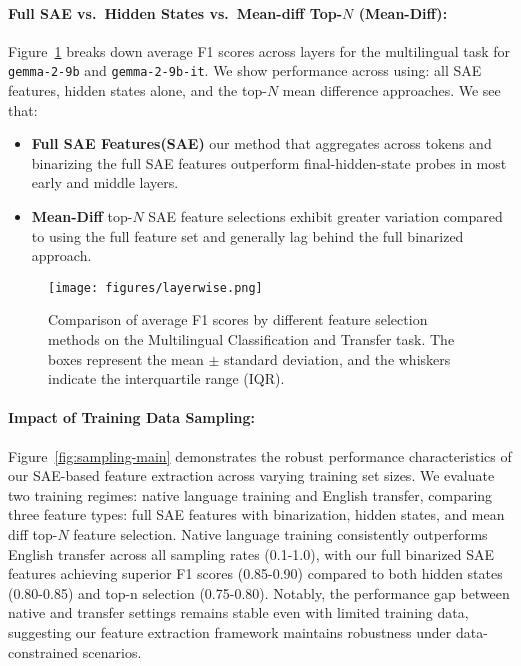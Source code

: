 \paragraph{Full SAE vs.\ Hidden States vs.\ Mean-diff Top-$N$ (Mean-Diff):}
Figure~\ref{fig:layerwise} breaks down average F1 scores across layers for the multilingual task for \texttt{gemma-2-9b} and \texttt{gemma-2-9b-it}. We show performance across using: all SAE features, hidden states alone, and the top-$N$ mean difference approaches.
We see that:
\begin{itemize}
    \item \textbf{Full SAE Features(SAE)} our method that aggregates across tokens and binarizing  the full SAE features outperform final-hidden-state probes in most early and middle layers. 
    \item \textbf{Mean-Diff} top-$N$ SAE feature selections exhibit greater variation compared to using the full feature set and generally lag behind the full binarized approach.
\end{itemize}

\begin{figure}[t]
    \centering
    \texttt{[image: figures/layerwise.png]}
    \caption{Comparison of average F1 scores by different feature selection methods on the Multilingual Classification and Transfer task. The boxes represent the mean $\pm$ standard deviation, and the whiskers indicate the interquartile range (IQR).}
    \label{fig:layerwise}
\end{figure}



\paragraph{Impact of Training Data Sampling:} Figure~\ref{fig:sampling-main} demonstrates the robust performance characteristics of our SAE-based feature extraction across varying training set sizes. We evaluate two training regimes: native language training and English transfer, comparing three feature types: full SAE features with binarization, hidden states, and mean diff top-$N$ feature selection. Native language training consistently outperforms English transfer across all sampling rates (0.1-1.0), with our full binarized SAE features achieving superior F1 scores (0.85-0.90) compared to both hidden states (0.80-0.85) and top-n selection (0.75-0.80). Notably, the performance gap between native and transfer settings remains stable even with limited training data, suggesting our feature extraction framework maintains robustness under data-constrained scenarios. 


